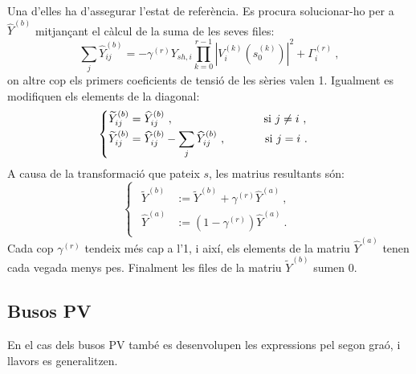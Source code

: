 Una d'elles ha d'assegurar l'estat de referència. Es procura solucionar-ho per a $\widehat{Y}^{(b)}$ mitjançant el càlcul de la suma de les seves files:
\begin{equation}
    \sum_{j}\widehat{Y}^{(b)}_{ij}=-\gamma^{(r)}Y_{sh,i}\prod_{k=0}^{r-1}|V^{(k)}_i(s^{(k)}_0)|^2+\Gamma^{(r)}_i\ ,
    \label{eq:C7r}
\end{equation}
on altre cop els primers coeficients de tensió de les sèries valen 1. Igualment es modifiquen els elements de la diagonal:
\begin{equation}
    \begin{cases}
    \begin{split}
        \widetilde{Y}^{(b)}_{ij}&=\widehat{Y}^{(b)}_{ij}\ ,\text{\hspace{77pt} si }j\neq i\ ,\\
        \widetilde{Y}^{(b)}_{ij}&= \widehat{Y}^{(b)}_{ij}-\sum_{j}\widehat{Y}^{(b)}_{ij}\ ,\text{\hspace{31.5pt} si }j=i\ .\\
    \end{split}
\end{cases}
    \label{eq:C8r}
\end{equation}
A causa de la transformació que pateix $s$, les matrius resultants són:
\begin{equation}
    \begin{cases}
    \begin{split}
    \widetilde{Y}^{(b)}&:=\widetilde{Y}^{(b)}+\gamma^{(r)}\widehat{Y}^{(a)}\ ,\\
    \widehat{Y}^{(a)}&:= (1-\gamma^{(r)})\widehat{Y}^{(a)}\ .
    \end{split}
\end{cases}
    \label{eq:sy6r}
\end{equation}
Cada cop $\gamma^{(r)}$ tendeix més cap a l'1, i així, els elements de la matriu $\widehat{Y}^{(a)}$ tenen cada vegada menys pes. Finalment les files de la matriu $\widetilde{Y}^{(b)}$ sumen 0.

\subsection{Busos PV}
En el cas dels busos PV també es desenvolupen les expressions pel segon graó, i llavors es generalitzen. 

